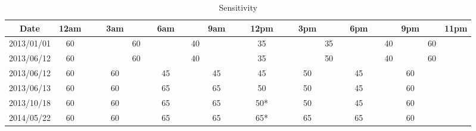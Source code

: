 \begin{table}[h]
\caption{Sensitivity}
\footnotesize
\begin{center}
\begin{tabular}{|c|c|c|c|c|c|c|c|c|c|c|c|c|c|c|c|c|c|c|c|c|c|c|c|c|}
\hline
Date       & 12am & & & 3am &    & &6am & &    & 9am & & & 12pm & & & 3pm &    & & 6pm & &    & 9pm &    & 11pm \\ \hline
2013/01/01 & 60   & & &     & 60 & &    & & 40 &     & & & 35   & & &     & 35 & &     & & 40 &     & 60 &      \\
2013/06/12 & 60   & & &     & 60 & &    & & 40 &     & & & 35   & & &     & 50 & &     & & 40 &     & 60 &      \\
2013/06/12 & 60   & & & 60  &    & & 45 & &    & 45  & & & 45   & & & 50  &    & & 45  & &    & 60  &    &      \\
2013/06/13 & 60   & & & 60  &    & & 65 & &    & 65  & & & 50   & & & 50  &    & & 45  & &    & 60  &    &      \\
2013/10/18 & 60   & & & 60  &    & & 65 & &    & 65  & & & 50*  & & & 50  &    & & 45  & &    & 60  &    &      \\
2014/05/22 & 60   & & & 60  &    & & 65 & &    & 65  & & & 65*  & & & 65  &    & & 65  & &    & 60  &    &      \\
\hline
\end{tabular}
\end{center}
\label{default}
\end{table}%

